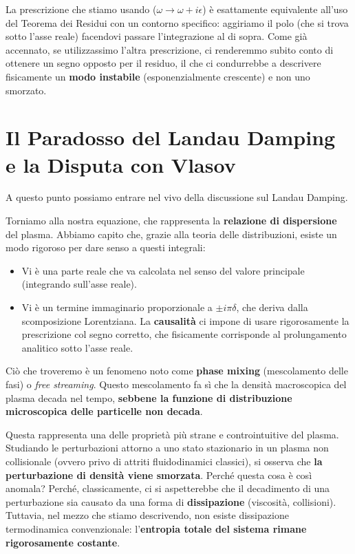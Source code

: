 La prescrizione che stiamo usando ($\omega \to \omega + i\epsilon$) è esattamente equivalente all'uso del Teorema dei Residui con un contorno specifico: aggiriamo il polo (che si trova sotto l'asse reale) facendovi passare l'integrazione al di sopra.
Come già accennato, se utilizzassimo l'altra prescrizione, ci renderemmo subito conto di ottenere un segno opposto per il residuo, il che ci condurrebbe a descrivere fisicamente un \textbf{modo instabile} (esponenzialmente crescente) e non uno smorzato.

\section{Il Paradosso del Landau Damping e la Disputa con Vlasov}

A questo punto possiamo entrare nel vivo della discussione sul Landau Damping.

Torniamo alla nostra equazione, che rappresenta la \textbf{relazione di dispersione} del plasma. Abbiamo capito che, grazie alla teoria delle distribuzioni, esiste un modo rigoroso per dare senso a questi integrali:
\begin{itemize}
\item Vi è una parte reale che va calcolata nel senso del valore principale (integrando sull'asse reale).
\item Vi è un termine immaginario proporzionale a $\pm i\pi\delta$, che deriva dalla scomposizione Lorentziana. La \textbf{causalità} ci impone di usare rigorosamente la prescrizione col segno corretto, che fisicamente corrisponde al prolungamento analitico sotto l'asse reale.
\end{itemize}

Ciò che troveremo è un fenomeno noto come \textbf{phase mixing} (mescolamento delle fasi) o \textit{free streaming}. Questo mescolamento fa sì che la densità macroscopica del plasma decada nel tempo, \textbf{sebbene la funzione di distribuzione microscopica delle particelle non decada}.

Questa rappresenta una delle proprietà più strane e controintuitive del plasma. Studiando le perturbazioni attorno a uno stato stazionario in un plasma non collisionale (ovvero privo di attriti fluidodinamici classici), si osserva che \textbf{la perturbazione di densità viene smorzata}.
Perché questa cosa è così anomala? Perché, classicamente, ci si aspetterebbe che il decadimento di una perturbazione sia causato da una forma di \textbf{dissipazione} (viscosità, collisioni). Tuttavia, nel mezzo che stiamo descrivendo, non esiste dissipazione termodinamica convenzionale: l'\textbf{entropia totale del sistema rimane rigorosamente costante}.

